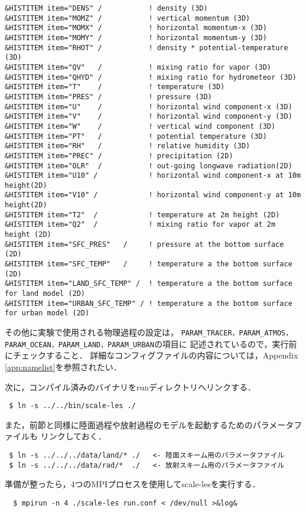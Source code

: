 \begin{verbatim}
&HISTITEM item="DENS" /           ! density (3D)
&HISTITEM item="MOMZ" /           ! vertical momentum (3D)
&HISTITEM item="MOMX" /           ! horizontal momentum-x (3D)
&HISTITEM item="MOMY" /           ! horizontal momentum-y (3D)
&HISTITEM item="RHOT" /           ! density * potential-temperature (3D)
&HISTITEM item="QV"   /           ! mixing ratio for vapor (3D)
&HISTITEM item="QHYD" /           ! mixing ratio for hydrometeor (3D)
&HISTITEM item="T"    /           ! temperature (3D)
&HISTITEM item="PRES" /           ! pressure (3D)
&HISTITEM item="U"    /           ! horizontal wind component-x (3D)
&HISTITEM item="V"    /           ! horizontal wind component-y (3D)
&HISTITEM item="W"    /           ! vertical wind component (3D)
&HISTITEM item="PT"   /           ! potential temperature (3D)
&HISTITEM item="RH"   /           ! relative humidity (3D)
&HISTITEM item="PREC" /           ! precipitation (2D)
&HISTITEM item="OLR"  /           ! out-going longwave radiation(2D)
&HISTITEM item="U10" /            ! horizontal wind component-x at 10m height(2D)
&HISTITEM item="V10" /            ! horizontal wind component-y at 10m height(2D)
&HISTITEM item="T2"  /            ! temperature at 2m height (2D)
&HISTITEM item="Q2"  /            ! mixing ratio for vapor at 2m height (2D)
&HISTITEM item="SFC_PRES"   /     ! pressure at the bottom surface (2D)
&HISTITEM item="SFC_TEMP"   /     ! temperature a the bottom surface (2D)
&HISTITEM item="LAND_SFC_TEMP" /  ! temperature a the bottom surface for land model (2D)
&HISTITEM item="URBAN_SFC_TEMP" / ! temperature a the bottom surface for urban model (2D)

\end{verbatim}


その他に実験で使用される物理過程の設定は，
\verb|PARAM_TRACER，PARAM_ATMOS，PARAM_OCEAN，PARAM_LAND，PARAM_URBAN|の項目に
記述されているので，実行前にチェックすること．
詳細なコンフィグファイルの内容については，Appendix \ref{app:namelist}を参照されたい．


次に，コンパイル済みのバイナリをrunディレクトリへリンクする．

\begin{verbatim}
 $ ln -s ../../bin/scale-les ./
\end{verbatim}

また，前節と同様に陸面過程や放射過程のモデルを起動するためのパラメータファイルも
リンクしておく．

\begin{verbatim}
 $ ln -s ../../../data/land/* ./   <- 陸面スキーム用のパラメータファイル
 $ ln -s ../../../data/rad/*  ./   <- 放射スキーム用のパラメータファイル
\end{verbatim}
準備が整ったら，4つのMPIプロセスを使用してscale-lesを実行する．
\begin{verbatim}
  $ mpirun -n 4 ./scale-les run.conf < /dev/null >&log&
\end{verbatim}

